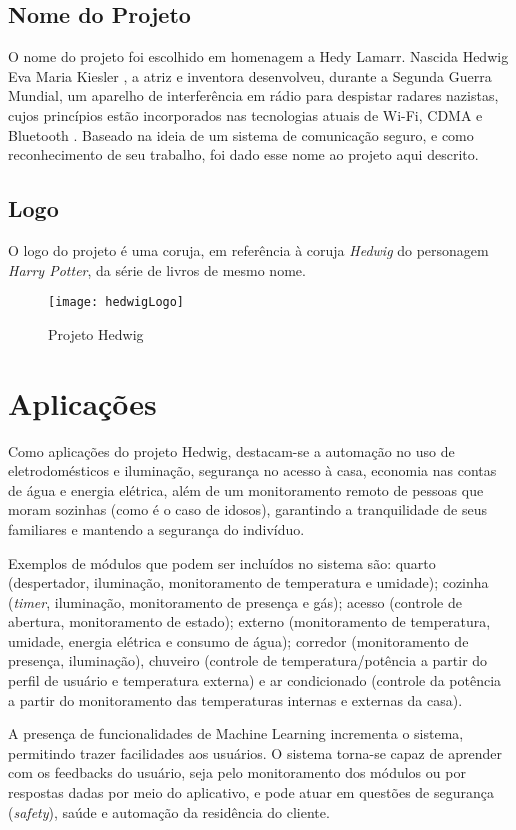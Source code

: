 \subsection{Nome do Projeto}
O nome do projeto foi escolhido em homenagem a Hedy Lamarr. Nascida Hedwig Eva Maria Kiesler \cite{shearer}, a atriz e inventora desenvolveu, durante a Segunda Guerra Mundial, um aparelho de interferência em rádio para despistar radares nazistas, cujos princípios estão incorporados nas tecnologias atuais de Wi-Fi, CDMA e Bluetooth \cite{electronicFrontier}. Baseado na ideia de um sistema de comunicação seguro, e como reconhecimento de seu trabalho, foi dado esse nome ao projeto aqui descrito.

\subsection{Logo}
O logo do projeto é uma coruja, em referência à coruja \textit{Hedwig} do personagem \textit{Harry Potter}, da série de livros de mesmo nome.
\begin{figure}[H]
	\centering
	\caption{Projeto Hedwig}
  \texttt{[image: hedwigLogo]}
\label{fig:hedwigLogo}
\end{figure}

\section{Aplicações}
Como aplicações do projeto Hedwig, destacam-se a automação no uso de eletrodomésticos e iluminação, segurança no acesso à casa, economia nas contas de água e energia elétrica, além de um monitoramento remoto de pessoas que moram sozinhas (como é o caso de idosos), garantindo a tranquilidade de seus familiares e mantendo a segurança do indivíduo.

Exemplos de módulos que podem ser incluídos no sistema são: quarto (despertador, iluminação, monitoramento de temperatura e umidade); cozinha (\textit{timer}, iluminação, monitoramento de presença e gás); acesso (controle de abertura, monitoramento de estado); externo (monitoramento de temperatura, umidade, energia elétrica e consumo de água); corredor (monitoramento de presença, iluminação), chuveiro (controle de temperatura\slash potência a partir do perfil de usuário e temperatura externa) e ar condicionado (controle da potência a partir do monitoramento das temperaturas internas e externas da casa).

A presença de funcionalidades de Machine Learning incrementa o sistema, permitindo trazer facilidades aos usuários. O sistema torna-se capaz de aprender com os feedbacks do usuário, seja pelo monitoramento dos módulos ou por respostas dadas por meio do aplicativo, e pode atuar em questões de segurança (\textit{safety}), saúde e automação da residência do cliente.
